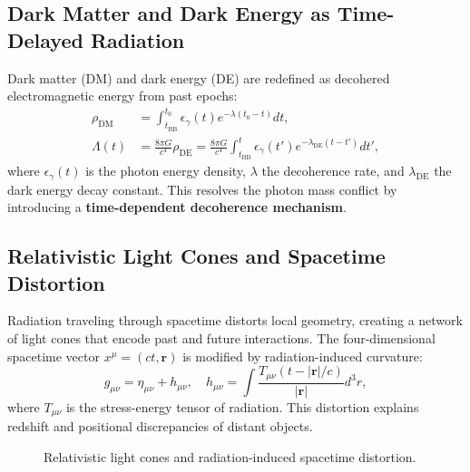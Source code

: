 \documentclass{article}
\begin{document}
\subsection{Dark Matter and Dark Energy as Time-Delayed Radiation}
Dark matter (DM) and dark energy (DE) are redefined as decohered electromagnetic energy from past epochs:
\begin{align}
\rho_{\text{DM}} &= \int_{t_{\text{BB}}}^{t_0} \epsilon_{\gamma}(t) e^{-\lambda (t_0 - t)} dt, \label{eq:dm} \\
\Lambda(t) &= \frac{8\pi G}{c^4} \rho_{\text{DE}} = \frac{8\pi G}{c^4} \int_{t_{\text{BB}}}^{t} \epsilon_{\gamma}(t') e^{-\lambda_{\text{DE}} (t - t')} dt', \label{eq:de}
\end{align}
where \( \epsilon_{\gamma}(t) \) is the photon energy density, \( \lambda \) the decoherence rate, and \( \lambda_{\text{DE}} \) the dark energy decay constant. This resolves the photon mass conflict by introducing a \textbf{time-dependent decoherence mechanism}.

\subsection{Relativistic Light Cones and Spacetime Distortion}
Radiation traveling through spacetime distorts local geometry, creating a network of light cones that encode past and future interactions. The four-dimensional spacetime vector \( x^\mu = (ct, \bm{r}) \) is modified by radiation-induced curvature:
\begin{equation}
g_{\mu\nu} = \eta_{\mu\nu} + h_{\mu\nu}, \quad h_{\mu\nu} = \int \frac{T_{\mu\nu}(t - |\bm{r}|/c)}{|\bm{r}|} d^3r, \label{eq:metric_pert}
\end{equation}
where \( T_{\mu\nu} \) is the stress-energy tensor of radiation. This distortion explains redshift and positional discrepancies of distant objects.

\begin{figure}[h]
\centering
{}
\caption{Relativistic light cones and radiation-induced spacetime distortion.}
\label{fig:light_cones}
\end{figure}
\end{document}
